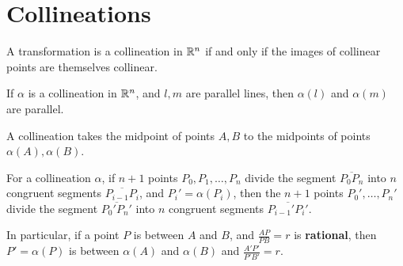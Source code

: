 \section{Collineations}

\begin{theorem}
    A transformation is a collineation in \(\mathbb{R}^n\) if and only if the images of collinear points are themselves collinear.
\end{theorem}

\begin{lemma}
    If \(\alpha\) is a collineation in \(\mathbb{R}^n\), and \(l, m\) are parallel lines, then \(\alpha(l)\) and \(\alpha(m)\) are parallel.
\end{lemma}

\begin{theorem}
    A collineation takes the midpoint of points \(A, B\) to the midpoints of points \(\alpha(A), \alpha(B)\).
\end{theorem}

\begin{corollary}
    For a collineation \(\alpha\), if \(n + 1\) points \(P_0, P_1, \dots, P_n\) divide the segment \(\overline{P_0P_n}\) into \(n\) congruent segments \(\overline{P_{i-1}P_i}\), and \(P_i' = \alpha(P_i)\), then the \(n + 1\) points \(P_0', \dots, P_n'\) divide the segment \(\overline{P_0'P_n'}\) into \(n\) congruent segments \(\overline{P_{i-1}'P_i'}\).

    In particular, if a point \(P\) is between \(A\) and \(B\), and \(\frac{AP}{PB} = r\) is \textbf{rational}, then \(P' = \alpha(P)\) is between \(\alpha(A)\) and \(\alpha(B)\) and \(\frac{A'P'}{P'B'} = r\).
\end{corollary}